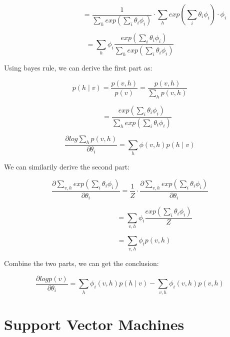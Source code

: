 \documentclass{article} %
\begin{document}
\begin{equation}
\qquad \qquad \qquad \quad =
\frac{1}{\sum_h exp(\sum_i \theta_i \phi_i)} \cdot
\sum_h exp(\sum_i \theta_i \phi_i) \cdot \phi_i
\end{equation}

\begin{equation}
= \sum_h \phi_i \frac{exp(\sum_i \theta_i \phi_i)}
{\sum_h exp(\sum_i \theta_i \phi_i)}
\end{equation}

Using bayes rule, we can derive the first part as:

\begin{equation}
p (h \mid v) = \frac{p(v,h)}{p(v)} = \frac{p(v,h)}{\sum_h p(v,h)}
\end{equation}

\begin{equation}
\qquad = 
\frac{exp(\sum_i \theta_i \phi_i)}{\sum_h exp(\sum_i \theta_i \phi_i)}
\end{equation}

\begin{equation}
\frac{\partial log \sum_h p(v,h)}{\partial \theta_i} =
\sum_h \phi(v,h) p (h \mid v)
\end{equation}

We can similarily derive the second part:

\begin{equation}
\frac{\partial \sum_{v,h} exp(\sum_i \theta_i \phi_i)}{\partial \theta_i}
= \frac{1}{Z} \cdot \frac{\partial \sum_{v,h} exp(\sum_i \theta_i \phi_i)}
{\partial \theta_i}
\end{equation}

\begin{equation}
\qquad \qquad \qquad \quad = 
\sum_{v,h} \phi_i \frac{exp(\sum_i \theta_i \phi_i)}{Z} 
\end{equation}

\begin{equation}
\qquad \qquad = 
\sum_{v,h} \phi_i p(v,h)
\end{equation}

Combine the two parts, we can get the conclusion:

\begin{equation}
\frac{\partial log p(v)}{\partial \theta_i} = \sum_h \phi_i (v,h) p(h \mid v)
- \sum_{v,h} \phi_i (v,h) p(v,h)
\end{equation}



\section{Support Vector Machines}
\end{document}
